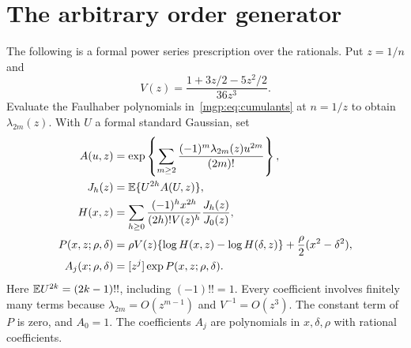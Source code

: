 \documentclass[11pt]{article}
\begin{document}
\section{The arbitrary order generator}\label{mgp:sec:allorders}
The following is a formal power series prescription over the rationals. Put $z=1/n$ and
\[
 V(z)=\frac{1+3z/2-5z^2/2}{36z^3}.
\]
Evaluate the Faulhaber polynomials in~\eqref{mgp:eq:cumulants} at $n=1/z$ to obtain $\lambda_{2m}(z)$. With $U$ a formal standard Gaussian, set
\begin{align}
 A(u,z)&=\exp\left\{\sum_{m\ge2}
            \frac{(-1)^m\lambda_{2m}(z)u^{2m}}{(2m)!}\right\},\label{mgp:eq:formalA}\\
 J_h(z)&=\mathbb E\{U^{2h}A(U,z)\},\label{mgp:eq:formalJ}\\
 H(x,z)&=\sum_{h\ge0}\frac{(-1)^h x^{2h}}{(2h)!V(z)^h}
                      \frac{J_h(z)}{J_0(z)},\label{mgp:eq:formalH}\\
 P(x,z;\rho,\delta)&=\rho V(z)\{\log H(x,z)-\log H(\delta,z)\}
                    +\frac\rho2(x^2-\delta^2),\label{mgp:eq:formalP}\\
 A_j(x;\rho,\delta)&=[z^j]\exp P(x,z;\rho,\delta).
\end{align}
Here $\mathbb E U^{2k}=(2k-1)!!$, including $(-1)!!=1$. Every coefficient involves finitely many terms because $\lambda_{2m}=O(z^{m-1})$ and $V^{-1}=O(z^3)$. The constant term of $P$ is zero, and $A_0=1$. The coefficients $A_j$ are polynomials in $x,\delta,\rho$ with rational coefficients.
\end{document}
